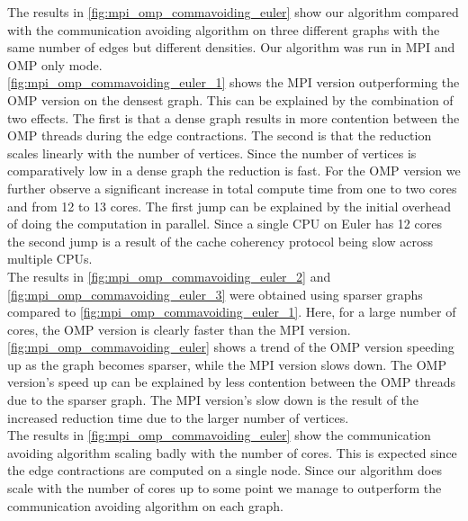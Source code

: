 The results in \autoref{fig:mpi_omp_commavoiding_euler} show our algorithm compared with the
communication avoiding algorithm \cite{comm_avoiding} on three different graphs with the same
number of edges but different densities. Our algorithm was run in MPI and OMP only mode.\\
\autoref{fig:mpi_omp_commavoiding_euler_1} shows the MPI version outperforming the OMP version
on the densest graph. This can be explained by the combination of two effects. The first is that a
dense graph results in more contention between the OMP threads during the
edge contractions. The second is that the reduction scales linearly with the number of vertices.
Since the number of vertices is comparatively low in a dense graph the
reduction is fast. For the OMP version we further observe a significant increase in total
compute time from one to two cores and from 12 to 13 cores. The first jump can be explained by the
initial overhead of doing the computation in parallel. Since a single CPU on Euler has 12 cores the
second jump is a result of  the cache coherency protocol being slow across multiple CPUs.\\
The results in \autoref{fig:mpi_omp_commavoiding_euler_2} and
\autoref{fig:mpi_omp_commavoiding_euler_3} were obtained using sparser graphs compared to
\autoref{fig:mpi_omp_commavoiding_euler_1}. Here, for a large number of cores, the OMP version
is clearly faster than the MPI version. \autoref{fig:mpi_omp_commavoiding_euler} shows a trend
of the OMP version speeding up as the graph becomes sparser, while the MPI version slows
down. The OMP version's speed up can be explained by less contention between the OMP
threads due to the sparser graph. The MPI version's slow down is the result of the increased
reduction time due to the larger number of vertices.\\
The results in \autoref{fig:mpi_omp_commavoiding_euler} show the communication avoiding algorithm
scaling badly with the number of cores. This is expected since the edge contractions are computed
on a single node. Since our algorithm does scale with the number of cores up
to some point we manage to outperform the communication avoiding algorithm on each graph.

%
%
%


